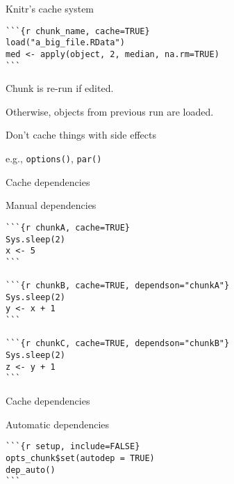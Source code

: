 \documentclass[12pt,t]{beamer}
\begin{document}
\begin{frame}[fragile]{Knitr's cache system}

\vspace{18pt}

\begin{lstlisting}
```{r chunk_name, cache=TRUE}
load("a_big_file.RData")
med <- apply(object, 2, median, na.rm=TRUE)
```
\end{lstlisting}

\bbi
\item Chunk is re-run if edited.
\item Otherwise, objects from previous run are loaded.
\item Don't cache things with side effects
  \bi
  \item[] e.g., {\tt options()}, {\tt par()}
  \ei
\ei


\end{frame}




\begin{frame}[fragile]{Cache dependencies}

\vspace{18pt}

Manual dependencies
\bigskip

\begin{lstlisting}
```{r chunkA, cache=TRUE}
Sys.sleep(2)
x <- 5
```

```{r chunkB, cache=TRUE, dependson="chunkA"}
Sys.sleep(2)
y <- x + 1
```

```{r chunkC, cache=TRUE, dependson="chunkB"}
Sys.sleep(2)
z <- y + 1
```
\end{lstlisting}

\end{frame}


\begin{frame}[fragile]{Cache dependencies}

\vspace{18pt}

Automatic dependencies
\bigskip

\begin{lstlisting}
```{r setup, include=FALSE}
opts_chunk$set(autodep = TRUE)
dep_auto()
```
\end{lstlisting}


\end{frame}
\end{document}
